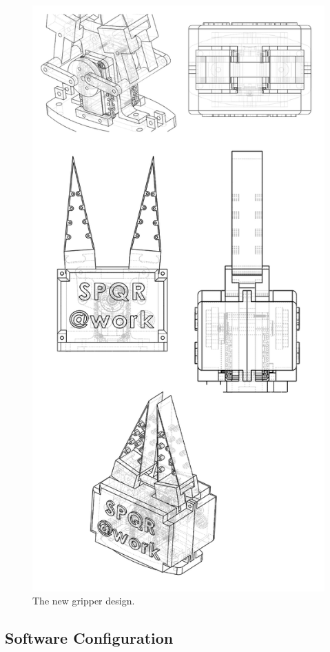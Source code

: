 \documentclass[conference]{IEEEtran}
\begin{document}
\begin{figure}[t!]
\begin{center}
\includegraphics[angle=0,width=0.7\linewidth,]{images/gripper_design.png}
\end{center}
\caption{The new gripper design.}\label{fig:gripper_design}
\end{figure}

 
\subsection{Software Configuration}
\end{document}
